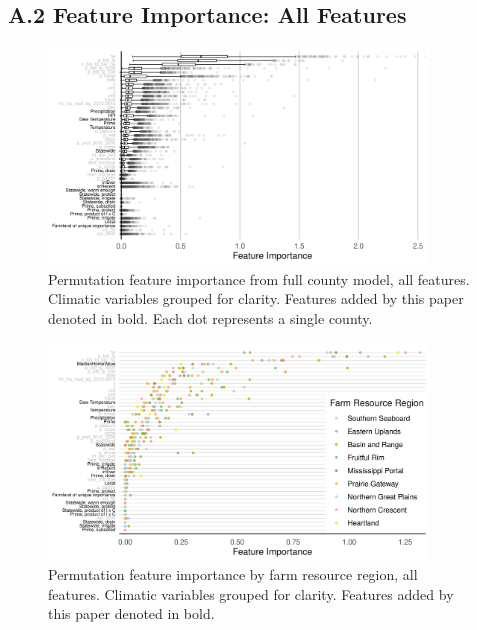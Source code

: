 \documentclass[12pt]{article}
\begin{document}
\newpage

\subsection*{A.2 Feature Importance: All Features}


\begin{figure}[H]
    \centering
    \includegraphics[width=0.9\textwidth]{exhibits/fcb_importance_all.png}
    \caption{Permutation feature importance from full county model, all features. Climatic variables grouped for clarity. Features added by this paper denoted in bold. Each dot represents a single county.}
    \label{fig:fcb_importance_all}
\end{figure}

\begin{figure}[H]
    \centering
    \includegraphics[width=0.9\textwidth]{exhibits/ffb_importance_all.png}
    \caption{Permutation feature importance by farm resource region, all features. Climatic variables grouped for clarity. Features added by this paper denoted in bold.}
    \label{fig:ffb_importance_all}
\end{figure}

\newpage
\end{document}
